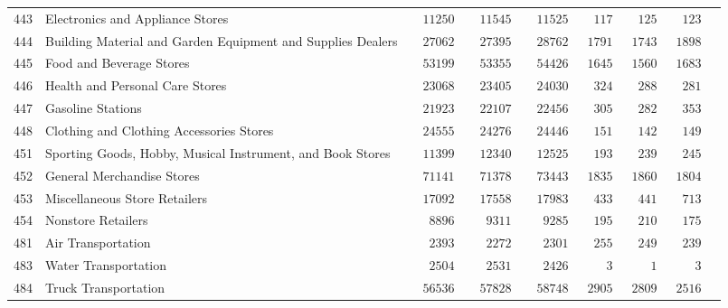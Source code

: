 \documentclass[9pt, oneside]{article}   	%
\begin{document}
\begin{longtable}{lp{3 in}ccccccc}
443  & Electronics and Appliance Stores & $\phantom{00}11250$ & $\phantom{00}11545$ & $\phantom{00}11525$ & $\phantom{00}117$ & $\phantom{00}125$ & $\phantom{00}123$ \\
444  & Building Material and Garden Equipment and Supplies Dealers & $\phantom{00}27062$ & $\phantom{00}27395$ & $\phantom{00}28762$ & $\phantom{0}1791$ & $\phantom{0}1743$ & $\phantom{0}1898$ \\
445  & Food and Beverage Stores & $\phantom{00}53199$ & $\phantom{00}53355$ & $\phantom{00}54426$ & $\phantom{0}1645$ & $\phantom{0}1560$ & $\phantom{0}1683$ \\
446  & Health and Personal Care Stores & $\phantom{00}23068$ & $\phantom{00}23405$ & $\phantom{00}24030$ & $\phantom{00}324$ & $\phantom{00}288$ & $\phantom{00}281$ \\
447  & Gasoline Stations & $\phantom{00}21923$ & $\phantom{00}22107$ & $\phantom{00}22456$ & $\phantom{00}305$ & $\phantom{00}282$ & $\phantom{00}353$ \\
448  & Clothing and Clothing Accessories Stores & $\phantom{00}24555$ & $\phantom{00}24276$ & $\phantom{00}24446$ & $\phantom{00}151$ & $\phantom{00}142$ & $\phantom{00}149$ \\
451  & Sporting Goods, Hobby, Musical Instrument, and Book Stores & $\phantom{00}11399$ & $\phantom{00}12340$ & $\phantom{00}12525$ & $\phantom{00}193$ & $\phantom{00}239$ & $\phantom{00}245$ \\
452  & General Merchandise Stores & $\phantom{00}71141$ & $\phantom{00}71378$ & $\phantom{00}73443$ & $\phantom{0}1835$ & $\phantom{0}1860$ & $\phantom{0}1804$ \\
453  & Miscellaneous Store Retailers & $\phantom{00}17092$ & $\phantom{00}17558$ & $\phantom{00}17983$ & $\phantom{00}433$ & $\phantom{00}441$ & $\phantom{00}713$ \\
454  & Nonstore Retailers & $\phantom{000}8896$ & $\phantom{000}9311$ & $\phantom{000}9285$ & $\phantom{00}195$ & $\phantom{00}210$ & $\phantom{00}175$ \\
481  & Air Transportation & $\phantom{000}2393$ & $\phantom{000}2272$ & $\phantom{000}2301$ & $\phantom{00}255$ & $\phantom{00}249$ & $\phantom{00}239$ \\
483  & Water Transportation & $\phantom{000}2504$ & $\phantom{000}2531$ & $\phantom{000}2426$ & $\phantom{0000}3$ & $\phantom{0000}1$ & $\phantom{0000}3$ \\
484  & Truck Transportation & $\phantom{00}56536$ & $\phantom{00}57828$ & $\phantom{00}58748$ & $\phantom{0}2905$ & $\phantom{0}2809$ & $\phantom{0}2516$ \\

\end{longtable}
\end{document}
